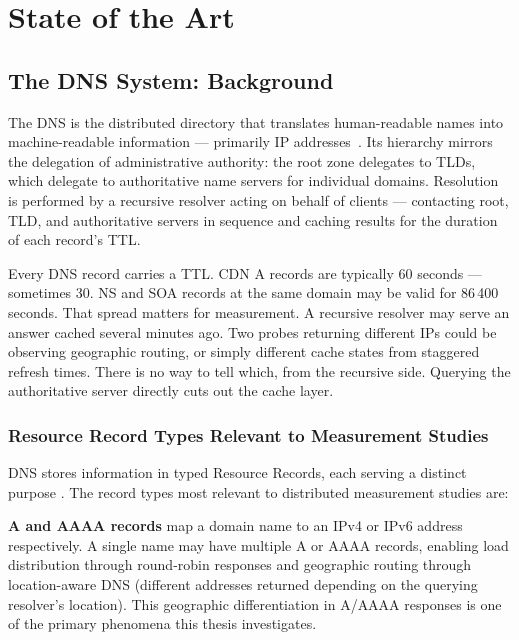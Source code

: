 \chapter{State of the Art}
\label{ch:state-of-the-art}

\section{The DNS System: Background}
\label{subsec:2.1}

The \ac{DNS} is the distributed directory that translates human-readable names into machine-readable information — primarily \ac{IP} addresses~\cite{RFC1034,RFC1035}. Its hierarchy mirrors the delegation of administrative authority: the root zone delegates to \ac{TLD}s, which delegate to authoritative name servers for individual domains. Resolution is performed by a recursive resolver acting on behalf of clients — contacting root, \ac{TLD}, and authoritative servers in sequence and caching results for the duration of each record's \ac{TTL}.

Every \ac{DNS} record carries a \ac{TTL}. \ac{CDN} A records are typically 60 seconds — sometimes 30. NS and SOA records at the same domain may be valid for 86\,400 seconds. That spread matters for measurement. A recursive resolver may serve an answer cached several minutes ago. Two probes returning different \ac{IP}s could be observing geographic routing, or simply different cache states from staggered refresh times. There is no way to tell which, from the recursive side. Querying the authoritative server directly cuts out the cache layer.

\subsection{Resource Record Types Relevant to Measurement Studies}
\label{sec:2.1.1}

\ac{DNS} stores information in typed Resource Records, each serving a distinct purpose \cite{RFC1035}. The record types most relevant to distributed measurement studies are:

\textbf{\ac{A} and \ac{AAAA} records} map a domain name to an \ac{IPv4} or \ac{IPv6} address respectively. A single name may have multiple \ac{A} or \ac{AAAA} records, enabling load distribution through round-robin responses and geographic routing through location-aware \ac{DNS} (different addresses returned depending on the querying resolver's location). This geographic differentiation in \ac{A}/\ac{AAAA} responses is one of the primary phenomena this thesis investigates.

